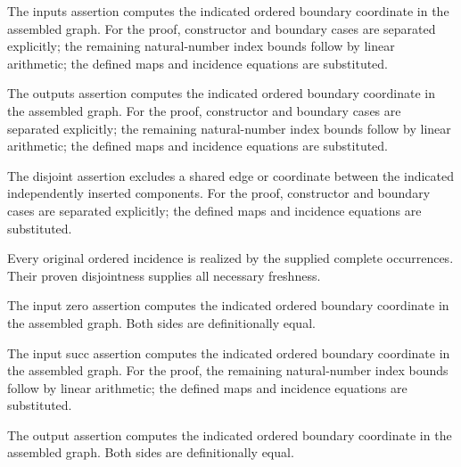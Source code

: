 The inputs assertion computes the indicated ordered boundary coordinate in the assembled graph.
For the proof, constructor and boundary cases are separated explicitly; the remaining natural-number index bounds follow by linear arithmetic; the defined maps and incidence equations are substituted.
\par{}

The outputs assertion computes the indicated ordered boundary coordinate in the assembled graph.
For the proof, constructor and boundary cases are separated explicitly; the remaining natural-number index bounds follow by linear arithmetic; the defined maps and incidence equations are substituted.
\par{}

The disjoint assertion excludes a shared edge or coordinate between the indicated independently inserted components.
For the proof, constructor and boundary cases are separated explicitly; the defined maps and incidence equations are substituted.
\par{}

Every original ordered incidence is realized by the supplied complete occurrences. Their proven disjointness supplies all necessary freshness.
\par{}

The input zero assertion computes the indicated ordered boundary coordinate in the assembled graph.
Both sides are definitionally equal.
\par{}

The input succ assertion computes the indicated ordered boundary coordinate in the assembled graph.
For the proof, the remaining natural-number index bounds follow by linear arithmetic; the defined maps and incidence equations are substituted.
\par{}

The output assertion computes the indicated ordered boundary coordinate in the assembled graph.
Both sides are definitionally equal.
\par{}

